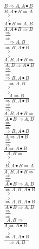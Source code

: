 \documentclass[11pt]{article}
\begin{document}
\begin{center}
\bigskip
\\$\frac{B\Rightarrow A, A\bullet B}{B, A\bullet B\Rightarrow A}$
\bigskip
\\$\frac{\Rightarrow }{\Rightarrow }$
\bigskip
\\$\frac{A\bullet B\Rightarrow A, B}{A, A\bullet B\Rightarrow B}$
\bigskip
\\$\frac{\Rightarrow }{\Rightarrow }$
\bigskip
\\$\frac{\Rightarrow A, B}{\Rightarrow B, A\bullet B}$
\bigskip
\\$\frac{\Rightarrow }{\Rightarrow }$
\bigskip
\\$\frac{A, B, A\bullet B\Rightarrow }{A, B\Rightarrow A\bullet B}$
\bigskip
\\$\frac{\Rightarrow }{\Rightarrow }$
\bigskip
\\$\frac{\Rightarrow B, A\bullet B}{\Rightarrow A, B}$
\bigskip
\\$\frac{\Rightarrow }{\Rightarrow }$
\bigskip
\\$\frac{A\Rightarrow B}{\Rightarrow B, A\bullet B}$
\bigskip
\\$\frac{\Rightarrow }{\Rightarrow }$
\bigskip
\\$\frac{A, B, A\bullet B\Rightarrow }{A\bullet B\Rightarrow A, B}$
\bigskip
\\$\frac{\Rightarrow }{\Rightarrow }$
\bigskip
\\$\frac{\Rightarrow B, A\bullet B}{A\Rightarrow A\bullet B}$
\bigskip
\\$\frac{\Rightarrow }{\Rightarrow }$
\bigskip
\\$\frac{A\Rightarrow A\bullet B}{A, B\Rightarrow }$
\bigskip
\\$\frac{\Rightarrow }{\Rightarrow }$
\bigskip
\\$\frac{B, A\bullet B\Rightarrow A}{A, B, A\bullet B\Rightarrow }$
\bigskip
\\$\frac{\Rightarrow }{\Rightarrow }$
\bigskip
\\$\frac{A\bullet B\Rightarrow A, B}{\Rightarrow A, B, A\bullet B}$
\bigskip
\\$\frac{\Rightarrow }{\Rightarrow }$
\bigskip
\\$\frac{\Rightarrow A, B, A\bullet B}{A\bullet B\Rightarrow A, B}$
\bigskip
\\$\frac{\Rightarrow }{\Rightarrow }$
\bigskip
\\$\frac{A, B\Rightarrow }{A\Rightarrow A\bullet B}$
\bigskip
\\$\frac{\Rightarrow }{\Rightarrow }$
\bigskip
\\$\frac{\Rightarrow A, A\bullet B}{\Rightarrow A, B}$

\end{center}
\end{document}
